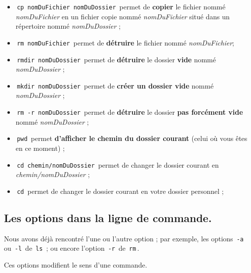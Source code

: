 \documentclass[11pt,a4paper]{article}
\begin{document}
\begin{itemize}
			\item \,\verb|cp nomDuFichier nomDuDossier|\, 
          permet de \textbf{copier} le fichier nomm\'e \textit{nomDuFichier}
          en un fichier copie  nomm\'e \textit{nomDuFichier} 
          situ\'e dans un r\'epertoire nomm\'e \textit{nomDuDossier} ; 
        
			\item \,\verb|rm nomDuFichier|\, 
          permet de \textbf{ d\'etruire } le fichier nomm\'e \textit{nomDuFichier}; 
        
			\item \,\verb|rmdir nomDuDossier|\, 
          permet de \textbf{d\'etruire} le dossier \textbf{vide} 
          nomm\'e \textit{nomDuDossier} ; 
        
			\item \,\verb|mkdir nomDuDossier|\, 
          permet de \textbf{cr\'eer un dossier vide} 
          nomm\'e \textit{nomDuDossier} ; 
        
			\item \,\verb|rm -r nomDuDossier|\, 
          permet de \textbf{d\'etruire} le dossier \textbf{pas forc\'ement vide} 
          nomm\'e \textit{nomDuDossier} ; 
        
			\item \,\verb|pwd|\, permet \textbf{d'afficher le chemin du dossier courant} 
          (celui o\`u vous \^etes en ce moment) ; 
        
			\item \,\verb|cd chemin/nomDuDossier|\, permet de changer le dossier 
          courant en \textit{chemin/nomDuDossier} ; 
        
			\item \,\verb|cd|\, permet de changer le dossier courant en votre dossier personnel ; 
        
					\end{itemize}
				\subsection{Les options dans la ligne de commande.}
				  Nous avons d\'ej\`a rencontr\'e l'une ou l'autre option ; 
				  par exemple, les options \,\verb|-a|\, 
				  ou \,\verb|-l|\, de \,\verb|ls|\, ;
				  ou encore l'option \,\verb|-r|\, de \,\verb|rm|\,.
        
            \par
        
				  Ces options modifient le sens d'une commande.
        
\end{document}
